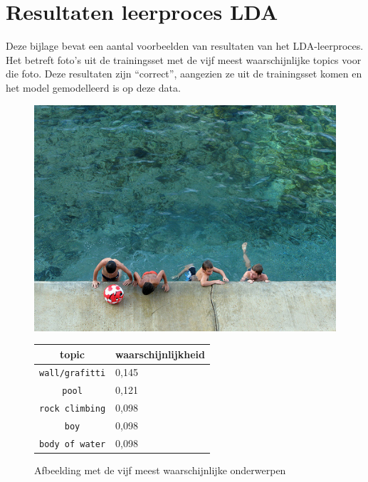 \chapter{Resultaten leerproces LDA}
\label{app:LDA}
Deze bijlage bevat een aantal voorbeelden van resultaten van het LDA-leerproces. Het betreft foto's uit de trainingsset met de vijf meest waarschijnlijke topics voor die foto. Deze resultaten zijn ``correct'', aangezien ze uit de trainingsset komen en het model gemodelleerd is op deze data.

\begin{figure}[h]
	\centering
	\begin{minipage}[t]{.5\linewidth}
		\centering
		\vspace{0pt}
		\includegraphics[width=\textwidth]{Images/LDA/3283626303.jpg}
	\end{minipage}\hfill
	\begin{minipage}[t]{.5\textwidth}
		\centering
		\vspace{0pt}
		\begin{tabularx}{\textwidth}{cl}
			topic                           & waarschijnlijkheid\\
			\hline
			\texttt{wall/grafitti} & 0,145\\
			\texttt{pool} & 0,121\\
			\texttt{rock climbing} & 0,098\\
			\texttt{boy} & 0,098\\
			\texttt{body of water} & 0,098\\
			\hline
		\end{tabularx}
	\end{minipage}
	\caption{Afbeelding met de vijf meest waarschijnlijke onderwerpen}
\end{figure}


